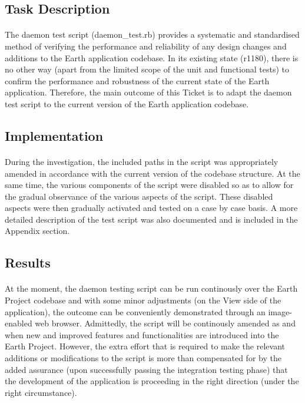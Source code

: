 \documentclass[oneside, 10pt, a4]{article}
\begin{document}
\subsection*{Task Description}

\paragraph{}
The daemon test script (daemon\_test.rb) provides a systematic and standardised method of verifying the
performance and reliability of any design changes and additions to the Earth application codebase. In its 
existing state (r1180), there is no other way (apart from the limited scope of the unit and functional tests) 
to confirm the performance and robustness of the current state of the Earth application. Therefore, the main 
outcome of this Ticket is to adapt the daemon test script to the current version of the Earth application
codebase.

\subsection*{Implementation}

\paragraph{}
During the investigation, the included paths in the script was appropriately amended in accordance 
with the current version of the codebase structure. At the same time, the various components of the script 
were disabled so as to allow for the gradual observance of the various aspects of the script. These disabled 
aspects were then gradually activated and tested on a case by case basis. A more detailed description of the 
test script was also documented and is included in the Appendix section.


\subsection*{Results}

\paragraph{}
At the moment, the daemon testing script can be run continously over the Earth Project codebase and with some 
minor adjustments (on the View side of the application), the outcome can be conveniently demonstrated through an 
image-enabled web browser. Admittedly, the script will be continously amended as and when new and improved 
features and functionalities are introduced into the Earth Project. However, the extra effort that is required 
to make the relevant additions or modifications to the script is more than compensated for by the added assurance 
(upon successfully passing the integration testing phase) that the development of the application is proceeding 
in the right direction (under the right circumstance).
\end{document}

